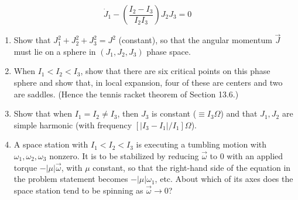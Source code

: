 \documentclass[../psets.tex]{subfiles}
\begin{document}
\begin{enumerate}
    \begin{equation*}
        \dot{J}_1-\left( \frac{I_2-I_3}{I_2I_3} \right)J_2J_3 = 0
    \end{equation*}
    \begin{enumerate}
        \item Show that $J_1^2+J_2^2+J_3^2=J^2$ (constant), so that the angular momentum $\vec{J}$ must lie on a sphere in $(J_1,J_2,J_3)$ phase space.
        \item When $I_1<I_2<I_3$, show that there are six critical points on this phase sphere and show that, in local expansion, four of these are centers and two are saddles. (Hence the tennis racket theorem of Section 13.6.)
        \item Show that when $I_1=I_2\neq I_3$, then $J_3$ is constant ($\equiv I_3\Omega$) and that $J_1,J_2$ are simple harmonic (with frequency $[|I_3-I_1|/I_1]\Omega$).
        \item A space station with $I_1<I_2<I_3$ is executing a tumbling motion with $\omega_1,\omega_2,\omega_3$ nonzero. It is to be stabilized by reducing $\vec{\omega}$ to 0 with an applied torque $-|\mu|\vec{\omega}$, with $\mu$ constant, so that the right-hand side of the equation in the problem statement becomes $-|\mu|\omega_1$, etc. About which of its axes does the space station tend to be spinning as $\vec{\omega}\to 0$?
    \end{enumerate}
\end{enumerate}
\end{document}
